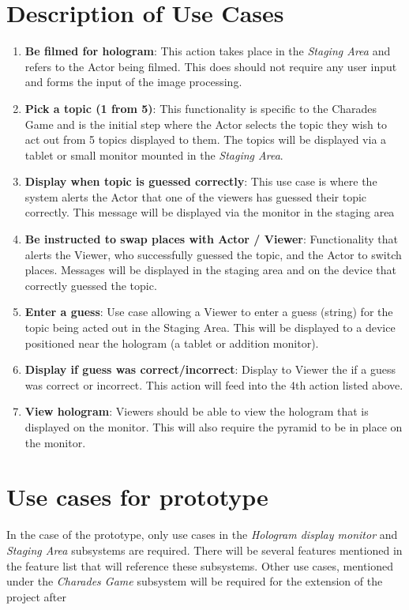 \documentclass{article}
\begin{document}
\section{Description of Use Cases}
\begin{enumerate}
	\item \textbf{Be filmed for hologram}: This action takes place in the \textit{Staging Area} and refers to the Actor being filmed. This does should not require any user input and forms the input of the image processing.
	
	\item \textbf{Pick a topic (1 from 5)}: This functionality is specific to the Charades Game and is the initial step where the Actor selects the topic they wish to act out from 5 topics displayed to them. The topics will be displayed via a tablet or small monitor mounted in the \textit{Staging Area}.
	
	\item \textbf{Display when topic is guessed correctly}: This use case is where the system alerts the Actor that one of the viewers has guessed their topic correctly. This message will be displayed via the monitor in the staging area
	
	\item \textbf{Be instructed to swap places with Actor / Viewer}: Functionality that alerts the Viewer, who successfully guessed the topic, and the Actor to switch places. Messages will be displayed in the staging area and on the device that correctly guessed the topic.
	
	\item \textbf{Enter a guess}: Use case allowing a Viewer to enter a guess (string) for the topic being acted out in the Staging Area. This will be displayed to a device positioned near the hologram (a tablet or addition monitor).
	
	\item \textbf{Display if guess was correct/incorrect}: Display to Viewer the if a guess was correct or incorrect. This action will feed into the 4th action listed above.
	
	\item \textbf{View hologram}: Viewers should be able to view the hologram that is displayed on the monitor. This will also require the pyramid to be in place on the monitor.
\end{enumerate}

\section{Use cases for prototype}
In the case of the prototype, only use cases in the \textit{Hologram display monitor} and \textit{Staging Area} subsystems are required. There will be several features mentioned in the feature list that will reference these subsystems. 
Other use cases, mentioned under the \textit{Charades Game} subsystem will be required for the extension of the project after 
\end{document}
